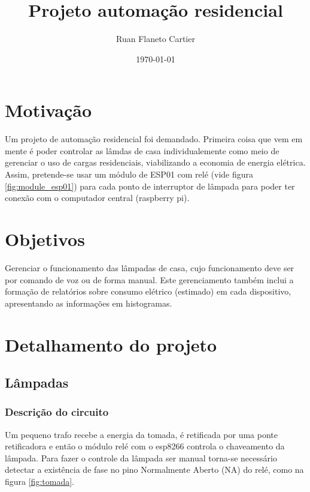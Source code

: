 \documentclass[11pt]{article}
\author{Ruan Flaneto Cartier}
\date{\today}
\title{Projeto automação residencial}
\begin{document}
\maketitle
\tableofcontents


\section{Motivação}
\label{sec:org6e136fa}
Um projeto de automação residencial foi demandado. Primeira coisa que vem em mente é poder controlar as lâmdas de casa individualemente como meio de gerenciar o uso de cargas residenciais, viabilizando a economia de energia elétrica. Assim, pretende-se usar um módulo de ESP01 com relé (vide figura \ref{fig:module_esp01}) para cada ponto de interruptor de lâmpada para poder ter conexão com o computador central (raspberry pi).

\section{Objetivos}
\label{sec:org7860a4c}
Gerenciar o funcionamento das lâmpadas de casa, cujo funcionamento deve ser por comando de voz ou de forma manual. Este gerenciamento também inclui a formação de relatórios sobre consumo elétrico (estimado) em cada dispositivo, apresentando as informações em histogramas.

\section{Detalhamento do projeto}
\label{sec:orgffc4f14}
\subsection{Lâmpadas}
\label{sec:orgf63aa0d}
\subsubsection{Descrição do circuito}
\label{sec:org8d8f7a6}
Um pequeno trafo recebe a energia da tomada, é retificada por uma ponte retificadora e então o módulo relé com o esp8266 controla o chaveamento da lâmpada. Para fazer o controle da lâmpada ser manual torna-se necessário detectar a existência de fase no pino Normalmente Aberto (NA) do relé, como na figura \ref{fig:tomada}.
\end{document}
